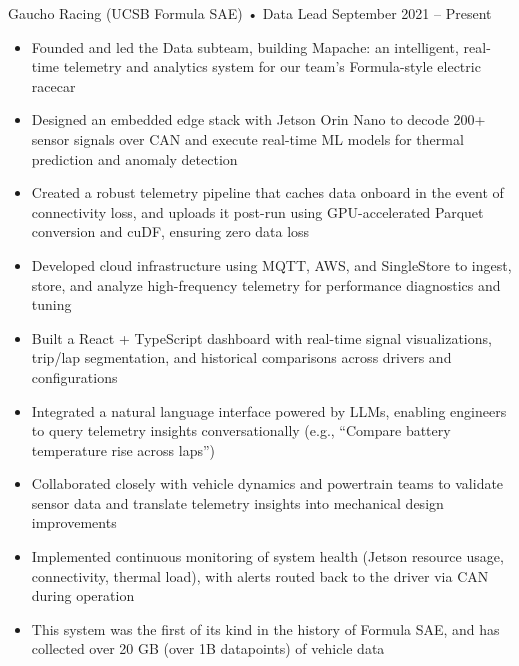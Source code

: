 \documentclass[9pt]{developercv} %
\begin{document}
\begin{entrylist}
    \entry
        {}
        {Gaucho Racing (UCSB Formula SAE) • Data Lead}
        {September 2021 – Present}
        {\vspace{-8pt}
        \begin{itemize}[noitemsep,topsep=0pt,parsep=0pt,partopsep=0pt, leftmargin=10pt]
            \item Founded and led the Data subteam, building Mapache: an intelligent, real-time telemetry and analytics system for our team's Formula-style electric racecar
            \item Designed an embedded edge stack with Jetson Orin Nano to decode 200+ sensor signals over CAN and execute real-time ML models for thermal prediction and anomaly detection
            \item Created a robust telemetry pipeline that caches data onboard in the event of connectivity loss, and uploads it post-run using GPU-accelerated Parquet conversion and cuDF, ensuring zero data loss
            \item Developed cloud infrastructure using MQTT, AWS, and SingleStore to ingest, store, and analyze high-frequency telemetry for performance diagnostics and tuning
            \item Built a React + TypeScript dashboard with real-time signal visualizations, trip/lap segmentation, and historical comparisons across drivers and configurations
            \item Integrated a natural language interface powered by LLMs, enabling engineers to query telemetry insights conversationally (e.g., “Compare battery temperature rise across laps”)
            \item Collaborated closely with vehicle dynamics and powertrain teams to validate sensor data and translate telemetry insights into mechanical design improvements
            \item Implemented continuous monitoring of system health (Jetson resource usage, connectivity, thermal load), with alerts routed back to the driver via CAN during operation
            \item This system was the first of its kind in the history of Formula SAE, and has collected over 20 GB (over 1B datapoints) of vehicle data
        \end{itemize}}

\end{entrylist}
\end{document}
